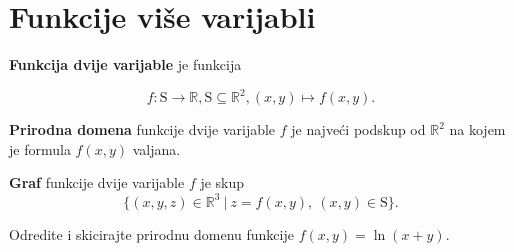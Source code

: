 \section{Funkcije više varijabli}

\textbf{Funkcija dvije varijable} je funkcija

$$
f: \mathrm{S} \to \mathbb{R}, \mathrm{S} \subseteq \mathbb{R}^2, (x, y) \mapsto f(x,y).
$$

\textbf{Prirodna domena} funkcije dvije varijable $f$ je najveći podskup od
$\mathbb{R}^2$ na kojem je formula $f(x,y)$ valjana.

\textbf{Graf} funkcije dvije varijable $f$ je skup
$$
  \{(x,y,z)\in\mathbb{R}^3\ |\ z=f(x,y),\ (x,y)\in\mathrm{S}\}.
$$

\begin{example}
  Odredite i skicirajte prirodnu domenu funkcije $f(x,y)=\ln(x+y)$.
\end{example}
